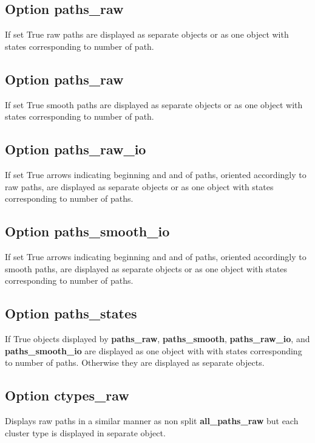 \documentclass[a4paper,10pt,english]{sphinxmanual}
\begin{document}
\subsection{Option \textbf{paths\_raw}}
\label{valve/valve_config:option-paths-raw}
If set True raw paths are displayed as separate objects or as one object with states corresponding to number of path.


\subsection{Option \textbf{paths\_raw}}
\label{valve/valve_config:id1}
If set True smooth paths are displayed as separate objects or as one object with states corresponding to number of path.


\subsection{Option \textbf{paths\_raw\_io}}
\label{valve/valve_config:option-paths-raw-io}
If set True arrows indicating beginning and and of paths, oriented accordingly to raw paths, are displayed as separate objects or as one object with states corresponding to number of paths.


\subsection{Option \textbf{paths\_smooth\_io}}
\label{valve/valve_config:option-paths-smooth-io}
If set True arrows indicating beginning and and of paths, oriented accordingly to smooth paths, are displayed as separate objects or as one object with states corresponding to number of paths.


\subsection{Option \textbf{paths\_states}}
\label{valve/valve_config:option-paths-states}
If True objects displayed by \textbf{paths\_raw}, \textbf{paths\_smooth}, \textbf{paths\_raw\_io}, and \textbf{paths\_smooth\_io} are displayed as one object with with states corresponding to number of paths. Otherwise they are displayed as separate objects.


\subsection{Option \textbf{ctypes\_raw}}
\label{valve/valve_config:option-ctypes-raw}
Displays raw paths in a similar manner as non split \textbf{all\_paths\_raw} but each cluster type is displayed in separate object.
\end{document}
